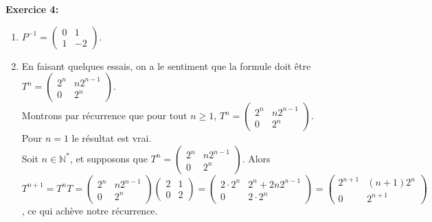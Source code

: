 \documentclass[a4paper, 10pt]{article}
\theoremstyle{plain}
\newcommand{\N}{\mathbb{N}}
\begin{document}
\bigskip
\noindent
\textbf{Exercice 4:}\\
\begin{enumerate}
\item
$P^{-1} =
\begin{pmatrix}
0 & 1 \\ 1 & -2
\end{pmatrix}$. 
\item
En faisant quelques essais, on a le sentiment que la formule doit être 
$T^n = 
\begin{pmatrix}
2^n & n2^{n-1} \\
0 & 2^n
\end{pmatrix}
$. \\
Montrons par récurrence que pour tout $n\geq 1$, 
$T^n = 
\begin{pmatrix}
2^n & n2^{n-1} \\
0 & 2^n
\end{pmatrix}
$. \\
Pour $n=1$ le résultat est vrai. \\
Soit $n\in \N^*$, et supposons que 
$T^n = 
\begin{pmatrix}
2^n & n2^{n-1} \\
0 & 2^n
\end{pmatrix}
$.
Alors 
$T^{n+1} =T^n T = 
\begin{pmatrix}
2^n & n2^{n-1} \\
0 & 2^n
\end{pmatrix}
\begin{pmatrix}
 2&1\\ 0 & 2
\end{pmatrix}
=
\begin{pmatrix}
2\cdot 2^n& 2^n +2n2^{n-1} \\
0 & 2\cdot 2^n
\end{pmatrix}
=
\begin{pmatrix}
2^{n+1} & (n+1)2^n \\
0 & 2^{n+1}
\end{pmatrix}
$, ce qui achève notre récurrence.


\end{enumerate}
\end{document}
